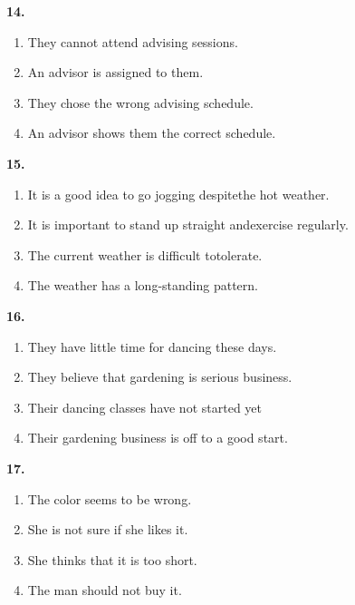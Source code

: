 \documentclass[12pt]{article}
\begin{document}
\vspace{0.25\baselineskip}
\noindent\textbf{14.}
\begin{enumerate}[label=(\Alph*),leftmargin=*,itemsep=0.2em]
\item They cannot attend advising sessions.
\item An advisor is assigned to them.
\item They chose the wrong advising schedule.
\item An advisor shows them the correct schedule.
\end{enumerate}
\par
\vspace{0.25\baselineskip}
\noindent\textbf{15.}
\begin{enumerate}[label=(\Alph*),leftmargin=*,itemsep=0.2em]
\item It is a good idea to go jogging despitethe hot weather.
\item It is important to stand up straight andexercise regularly.
\item The current weather is difficult totolerate.
\item The weather has a long-standing pattern.
\end{enumerate}
\par
\vspace{0.25\baselineskip}
\noindent\textbf{16.}
\begin{enumerate}[label=(\Alph*),leftmargin=*,itemsep=0.2em]
\item They have little time for dancing these days.
\item They believe that gardening is serious business.
\item Their dancing classes have not started yet
\item Their gardening business is off to a good start.
\end{enumerate}
\par
\vspace{0.25\baselineskip}
\noindent\textbf{17.}
\begin{enumerate}[label=(\Alph*),leftmargin=*,itemsep=0.2em]
\item The color seems to be wrong.
\item She is not sure if she likes it.
\item She thinks that it is too short.
\item The man should not buy it.
\end{enumerate}
\par
\vspace{0.25\baselineskip}
\end{document}
